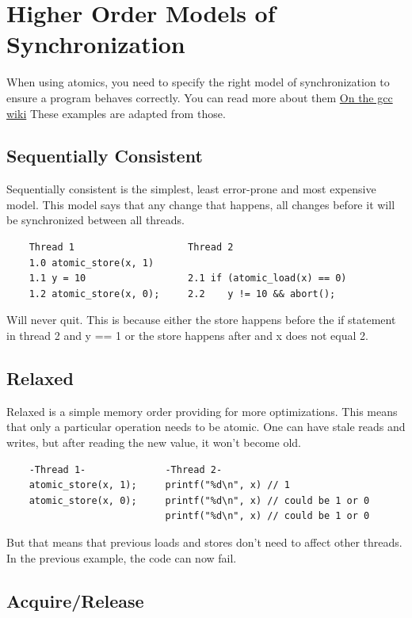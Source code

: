 \section{Higher Order Models of Synchronization}

When using atomics, you need to specify the right model of synchronization to ensure a program behaves correctly.
You can read more about them \href{https://gcc.gnu.org/wiki/Atomic/GCCMM/AtomicSync}{On the gcc wiki}
These examples are adapted from those.

\subsection{Sequentially Consistent}

Sequentially consistent is the simplest, least error-prone and most expensive model. This model says that any change that happens, all changes before it will be synchronized between all threads.

\begin{verbatim}
    Thread 1                    Thread 2
    1.0 atomic_store(x, 1)
    1.1 y = 10                  2.1 if (atomic_load(x) == 0)
    1.2 atomic_store(x, 0);     2.2    y != 10 && abort();
\end{verbatim}

Will never quit.
This is because either the store happens before the if statement in thread 2 and y == 1 or the store happens after and x does not equal 2.

\subsection{Relaxed}

Relaxed is a simple memory order providing for more optimizations.
This means that only a particular operation needs to be atomic.
One can have stale reads and writes, but after reading the new value, it won't become old.

\begin{verbatim}
    -Thread 1-              -Thread 2-
    atomic_store(x, 1);     printf("%d\n", x) // 1
    atomic_store(x, 0);     printf("%d\n", x) // could be 1 or 0
                            printf("%d\n", x) // could be 1 or 0
\end{verbatim}

But that means that previous loads and stores don't need to affect other threads.
In the previous example, the code can now fail.

\subsection{Acquire/Release}

